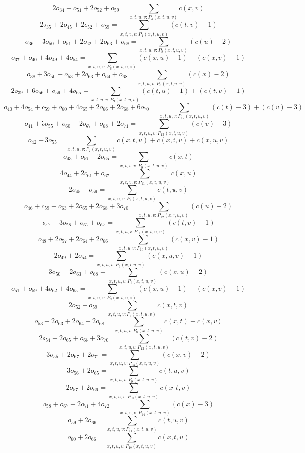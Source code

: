 \[2o_{34} + o_{51} + 2o_{52} + o_{59} = \sum\limits_{x,t,u,v:P_{4} (x,t,u,v)} c( x, v ) \]
\[2o_{35} + 2o_{45} + 2o_{52} + o_{59} = \sum\limits_{x,t,u,v:P_{4} (x,t,u,v)} ( c( t, v ) - 1 ) \]
\[o_{36} + 3o_{50} + o_{51} + 2o_{62} + 2o_{63} + o_{68} = \sum\limits_{x,t,u,v:P_{8} (x,t,u,v)} ( c( u ) - 2 ) \]
\[o_{37} + o_{40} + 4o_{49} + 4o_{54} = \sum\limits_{x,t,u,v:P_{6} (x,t,u,v)} ( c( x, u ) - 1 ) + ( c( x, v ) - 1 ) \]
\[o_{38} + 3o_{50} + o_{53} + 2o_{63} + o_{64} + o_{68} = \sum\limits_{x,t,u,v:P_{8} (x,t,u,v)} ( c( x ) - 2 ) \]
\[2o_{39} + 6o_{56} + o_{59} + 4o_{65} = \sum\limits_{x,t,u,v:P_{9} (x,t,u,v)} ( c( t, u ) - 1 ) + ( c( t, v ) - 1 ) \]
\[o_{40} + 4o_{54} + o_{59} + o_{60} + 4o_{65} + 2o_{66} + 2o_{68} + 6o_{70} = \sum\limits_{x,t,u,v:P_{12} (x,t,u,v)} ( c( t ) - 3 ) + ( c( v ) - 3 ) \]
\[o_{41} + 3o_{55} + o_{60} + 2o_{67} + o_{68} + 2o_{71} = \sum\limits_{x,t,u,v:P_{13} (x,t,u,v)} ( c( v ) - 3 ) \]
\[o_{42} + 3o_{55} = \sum\limits_{x,t,u,v:P_{7} (x,t,u,v)} c( x, t, u ) + c( x, t, v ) + c( x, u, v ) \]
\[o_{43} + o_{59} + 2o_{65} = \sum\limits_{x,t,u,v:P_{9} (x,t,u,v)} c( x, t ) \]
\[4o_{44} + 2o_{61} + o_{67} = \sum\limits_{x,t,u,v:P_{11} (x,t,u,v)} c( x, u ) \]
\[2o_{45} + o_{59} = \sum\limits_{x,t,u,v:P_{4} (x,t,u,v)} c( t, u, v ) \]
\[o_{46} + o_{59} + o_{63} + 2o_{65} + 2o_{68} + 3o_{70} = \sum\limits_{x,t,u,v:P_{12} (x,t,u,v)} ( c( u ) - 2 ) \]
\[o_{47} + 3o_{58} + o_{63} + o_{67} = \sum\limits_{x,t,u,v:P_{11} (x,t,u,v)} ( c( t, v ) - 1 ) \]
\[o_{48} + 2o_{57} + 2o_{64} + 2o_{66} = \sum\limits_{x,t,u,v:P_{10} (x,t,u,v)} ( c( x, v ) - 1 ) \]
\[2o_{49} + 2o_{54} = \sum\limits_{x,t,u,v:P_{6} (x,t,u,v)} ( c( x, u, v ) - 1 ) \]
\[3o_{50} + 2o_{63} + o_{68} = \sum\limits_{x,t,u,v:P_{8} (x,t,u,v)} ( c( x, u ) - 2 ) \]
\[o_{51} + o_{59} + 4o_{62} + 4o_{65} = \sum\limits_{x,t,u,v:P_{9} (x,t,u,v)} ( c( x, u ) - 1 ) + ( c( x, v ) - 1 ) \]
\[2o_{52} + o_{59} = \sum\limits_{x,t,u,v:P_{4} (x,t,u,v)} c( x, t, v ) \]
\[o_{53} + 2o_{63} + 2o_{64} + 2o_{68} = \sum\limits_{x,t,u,v:P_{8} (x,t,u,v)} c( x, t ) + c( x, v ) \]
\[2o_{54} + 2o_{65} + o_{66} + 3o_{70} = \sum\limits_{x,t,u,v:P_{12} (x,t,u,v)} ( c( t, v ) - 2 ) \]
\[3o_{55} + 2o_{67} + 2o_{71} = \sum\limits_{x,t,u,v:P_{13} (x,t,u,v)} ( c( x, v ) - 2 ) \]
\[3o_{56} + 2o_{65} = \sum\limits_{x,t,u,v:P_{9} (x,t,u,v)} c( t, u, v ) \]
\[2o_{57} + 2o_{66} = \sum\limits_{x,t,u,v:P_{10} (x,t,u,v)} c( x, t, v ) \]
\[o_{58} + o_{67} + 2o_{71} + 4o_{72} = \sum\limits_{x,t,u,v:P_{14} (x,t,u,v)} ( c( x ) - 3 ) \]
\[o_{59} + 2o_{66} = \sum\limits_{x,t,u,v:P_{10} (x,t,u,v)} c( t, u, v ) \]
\[o_{60} + 2o_{66} = \sum\limits_{x,t,u,v:P_{10} (x,t,u,v)} c( x, t, u ) \]
